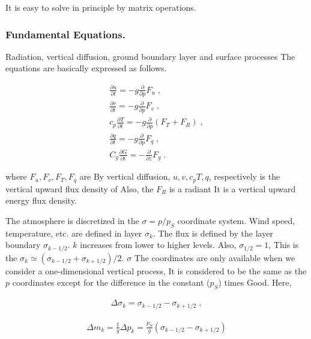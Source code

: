 It is easy to solve in principle by matrix operations.

\hypertarget{fundamental-equations.}{%
\subsubsection{Fundamental Equations.}\label{fundamental-equations.}}

Radiation, vertical diffusion, ground boundary layer and surface
processes The equations are basically expressed as follows.

\begin{eqnarray}
     \frac{\partial u}{\partial t}   =   - g \frac{\partial }{\partial p} F_u \; , \\
     \frac{\partial v}{\partial t}   =   - g \frac{\partial }{\partial p} F_v \; , \\
 c_p \frac{\partial T}{\partial t}   =   - g \frac{\partial }{\partial p} ( F_T + F_R ) \; , \\
     \frac{\partial q}{\partial t}   =   - g \frac{\partial }{\partial p} F_q \; , \\
 C_g \frac{\partial G}{\partial t}   =   -   \frac{\partial }{\partial z} F_g \; .
\end{eqnarray}

where \(F_u, F_v, F_T, F_q\) are By vertical diffusion,
\(u, v, c_p T, q\), respectively is the vertical upward flux density of
Also, the \(F_R\) is a radiant It is a vertical upward energy flux
density.

The atmosphere is discretized in the \(\sigma=p/p_S\) coordinate system.
Wind speed, temperature, etc. are defined in layer \(\sigma_k\). The
flux is defined by the layer boundary \(\sigma_{k-1/2}\). \(k\)
increases from lower to higher levels. Also, \(\sigma_{1/2} = 1\), This
is the \(\sigma_{k} \simeq (\sigma_{k-1/2} + \sigma_{k+1/2})/2\).
\(\sigma\) The coordinates are only available when we consider a
one-dimensional vertical process, It is considered to be the same as the
\(p\) coordinates except for the difference in the constant (\(p_S\))
times Good. Here,

\begin{eqnarray}
  \Delta \sigma_{k} = \sigma_{k-1/2} - \sigma_{k+1/2} \; ,
\end{eqnarray}

\begin{eqnarray}
  \Delta m_{k} = \frac{1}{g} \Delta p_k  
   = \frac{p_S}{g} ( \sigma_{k-1/2} - \sigma_{k+1/2} )
\end{eqnarray}

